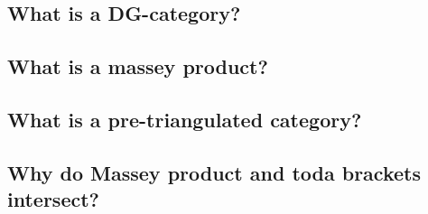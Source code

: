 \subsection{What is a DG-category?}


\subsection{What is a massey product?}


\subsection{What is a pre-triangulated category?}


\subsection{Why do Massey product and toda brackets intersect?}

